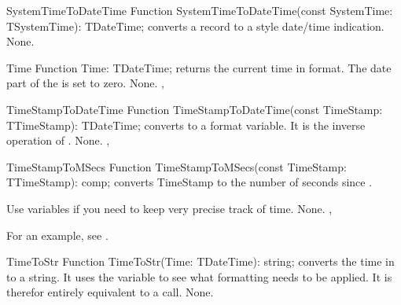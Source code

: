 

\begin{function}{SystemTimeToDateTime}
\Declaration
Function SystemTimeToDateTime(const SystemTime: TSystemTime): TDateTime;
\Description
{} converts a  record to a
 style date/time indication.
\Errors
None.
\SeeAlso
{}
\end{function}



\begin{function}{Time}
\Declaration
Function Time: TDateTime;
\Description
{} returns the current time in  format. The date
part of the  is set to zero.
\Errors
None.
\SeeAlso
{}, 
\end{function}




\begin{function}{TimeStampToDateTime}
\Declaration
Function TimeStampToDateTime(const TimeStamp: TTimeStamp): TDateTime;
\Description
{} converts  to a 
format variable. It is the inverse operation of .
\Errors
None.
\SeeAlso
{}, 
\end{function}



\begin{function}{TimeStampToMSecs}
\Declaration
Function TimeStampToMSecs(const TimeStamp: TTimeStamp): comp;
\Description
{} converts {TimeStamp} to the number of seconds
since .

Use  variables if you need to keep very precise track of
time.
\Errors
None.
\SeeAlso
{}, 
\end{function}

For an example, see .

\begin{function}{TimeToStr}
\Declaration
Function TimeToStr(Time: TDateTime): string;
\Description
{} converts the time in  to a string. It uses
the  variable to see what formatting needs to be
applied. It is therefor entirely equivalent to a
 call.
\Errors
None.
\SeeAlso
\end{function}

